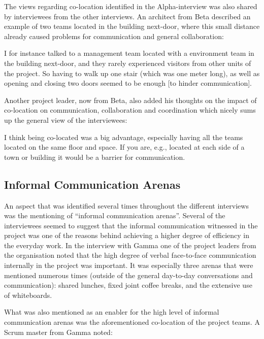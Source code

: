 The views regarding co-location identified in the Alpha-interview was also shared by interviewees from the other interviews. An architect from Beta described an example of two teams located in the building next-door, where this small distance already caused problems for communication and general collaboration:

\begin{fancyquotes}
I for instance talked to a management team located with a environment team in the building next-door, and they rarely experienced visitors from other units of the project. So having to walk up one stair (which was one meter long), as well as opening and closing two doors seemed to be enough [to hinder communication].
\end{fancyquotes}

Another project leader, now from Beta, also added his thoughts on the impact of co-location on communication, collaboration and coordination which nicely sums up the general view of the interviewees:

\begin{fancyquotes}
I think being co-located was a big advantage, especially having all the teams located on the same floor and space. If you are, e.g., located at each side of a town or building it would be a barrier for communication.
\end{fancyquotes}

\subsection{Informal Communication Arenas}

An aspect that was identified several times throughout the different interviews was the mentioning of ``informal communication arenas''. Several of the interviewees seemed to suggest that the informal communication witnessed in the project was one of the reasons behind achieving a higher degree of efficiency in the everyday work. In the interview with Gamma one of the project leaders from the organisation noted that the high degree of verbal face-to-face communication internally in the project was important. It was especially three arenas that were mentioned numerous times (outside of the general day-to-day conversations and communication): shared lunches, fixed joint coffee breaks, and the extensive use of whiteboards.

What was also mentioned as an enabler for the high level of informal communication arenas was the aforementioned co-location of the project teams. A Scrum master from Gamma noted:

